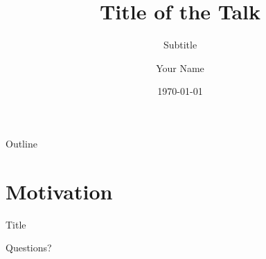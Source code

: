 \documentclass[aspectratio=169]{beamer}
\title{Title of the Talk}
\subtitle{Subtitle}
\author{Your Name}
\institute{Institution}
\date{\today}
\begin{document}
\maketitle

\begin{frame}{Outline}
  \tableofcontents
\end{frame}

\section{Motivation}
\begin{frame}{Title}
\end{frame}

\begin{frame}[standout]
  Questions?
\end{frame}
\end{document}
